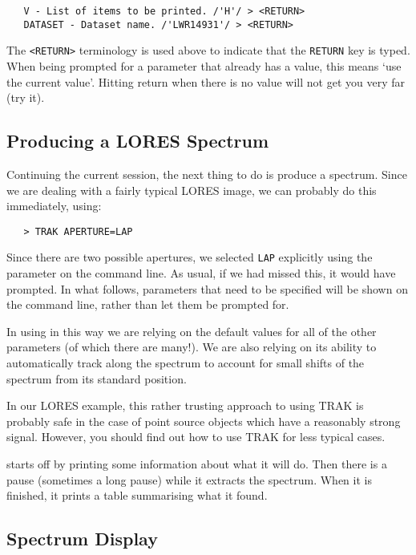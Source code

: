 \begin{verbatim}
   V - List of items to be printed. /'H'/ > <RETURN>
   DATASET - Dataset name. /'LWR14931'/ > <RETURN>
\end{verbatim}

The \verb+<RETURN>+ terminology is used above to indicate that the
\verb+RETURN+ key is typed.  When being prompted for a parameter that already
has a value, this means `use the current value'\@.  Hitting return when there
is no value will not get you very far (try it)\@.


\subsection{Producing a LORES Spectrum}

Continuing the current session, the next thing to do is produce a
spectrum.  Since we are dealing with a fairly typical LORES image, we can
probably do this immediately, using:

\begin{verbatim}
   > TRAK APERTURE=LAP
\end{verbatim}

Since there are two possible apertures, we selected \verb+LAP+ explicitly using
the  parameter on the command line.  As usual, if we had missed
this, it would have prompted.  In what follows, parameters that need to be
specified will be shown on the command line, rather than let them be prompted
for.

In using  in this way we are relying on the default values for all of
the other parameters (of which there are many!)\@.  We are also relying on its
ability to automatically track along the spectrum to account for small
shifts of the spectrum from its standard position.

In our LORES example, this rather trusting approach to using TRAK is
probably safe in the case of point source objects which have a reasonably 
strong signal.  However, you should find out how to use TRAK for less typical
cases.

 starts off by printing some information about what it will do.  Then
there is a pause (sometimes a long pause) while it extracts the spectrum.  When
it is finished, it prints a table summarising what it found.


\subsection{Spectrum Display}

